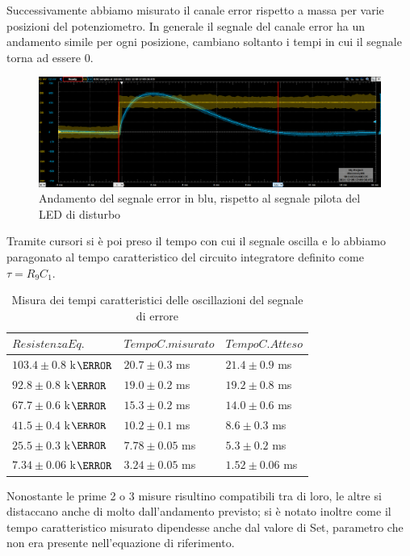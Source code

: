 \documentclass[10pt, a4paper, italian]{article}
\begin{document}
Successivamente abbiamo misurato il canale error rispetto a massa per varie posizioni del potenziometro. In generale il segnale del canale error ha un andamento simile per ogni posizione, cambiano soltanto i tempi in cui il segnale torna ad essere 0.
\begin{figure}[H]
    \centering
	\includegraphics[scale=0.4]{7}
    \caption{Andamento del segnale error in blu, rispetto al segnale pilota del LED di disturbo
    \label{fig: Draft1}}
\end{figure}
Tramite cursori si è poi preso il tempo con cui il segnale oscilla e lo abbiamo paragonato al tempo caratteristico del circuito integratore definito come $\tau = R_9C_1$.
\begin{table}[H]
\centering
\begin{tabular}{@{}lll@{}}
\toprule
$Resistenza Eq.$ & $Tempo C. misurato$ & $Tempo C. Atteso$\\
\midrule
$103.4 \pm 0.8 $ k$\ohm$ & $20.7 \pm 0.3$ ms  	& $ 21.4 \pm 0.9$ ms	\\
$92.8 \pm 0.8$ k$\ohm$ & $19.0 \pm 0.2$ ms 	& $ 19.2 \pm 0.8 $ ms	\\
$67.7 \pm 0.6$ k$\ohm$ & $15.3 \pm 0.2$ ms 	& $ 14.0 \pm 0.6 $ ms\\
$41.5 \pm 0.4$ k$\ohm$ & $10.2 \pm 0.1$ 	ms & $ 8.6 \pm 0.3 $ ms\\
$25.5 \pm 0.3$ k$\ohm$ & $7.78 \pm 0.05$ 	ms & $ 5.3 \pm 0.2 $ ms\\
$7.34 \pm0.06$ k$\ohm$ & $3.24 \pm 0.05$ 	ms & $ 1.52 \pm 0.06$ ms\\

\bottomrule
\end{tabular}
\caption{Misura dei tempi caratteristici delle oscillazioni del segnale di errore}
\end{table}
Nonostante le prime  2 o 3 misure risultino compatibili tra di loro, le altre si distaccano anche di molto dall'andamento previsto; si è notato inoltre come il tempo caratteristico misurato dipendesse anche dal valore di Set, parametro che non era presente nell'equazione di riferimento.
\end{document}
